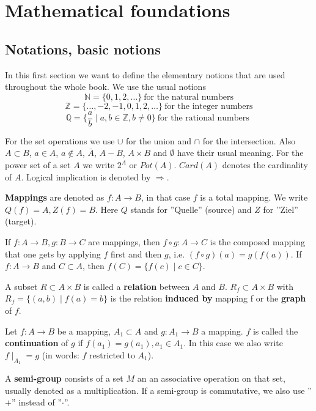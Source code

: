 \chapter{Mathematical foundations}

\section{Notations, basic notions}

In this first section we want to define the elementary notions that are used
throughout the whole book. We use the usual notions
\[ \mathbb{N} = \{ 0, 1, 2, \ldots \}\ \mbox{for the natural numbers} \]
\[ \mathbb{Z} = \{ \ldots, -2, -1, 0, 1, 2, \ldots \}\ \mbox{for the integer
numbers} \]
\[ \mathbb{Q} = \{ \frac{a}{b} \mid a,b \in \mathbb{Z}, b \neq 0 \}\ \mbox{for
the rational numbers } \]

For the set operations we use $\cup$ for the union and $\cap$ for the
intersection. Also $A \subset B$, $a \in A$, $a \not\in A$, $\bar{A}$, $A - B$,
$A \times B$ and $\emptyset$ have their usual meaning. For the power set of a
set $A$ we write $2^A$ or $Pot(A)$. $Card(A)$ denotes the cardinality of $A$.
Logical implication is denoted by $\Rightarrow$.

{\bf Mappings} are denoted as $f : A \rightarrow B$, in that case $f$ is a
total mapping. We write $Q(f) = A, Z(f) = B$. Here $Q$ stands for ''Quelle'' (source)
and $Z$ for ''Ziel'' (target).

If $f: A \rightarrow B, g : B \rightarrow C$ are mappings, then $f \circ g : A
\rightarrow C$ is the composed mapping that one gets by applying $f$ first and
then $g$, i.e. $(f \circ g)(a) = g(f(a))$. If $f:A \rightarrow B$ and $C
\subset A$, then $f(C) = \{ f(c) \mid c \in C \}$.

A subset $R \subset A \times B$ is called a {\bf relation} between $A$ and $B$.
$R_f \subset A \times B$ with $R_f = \{ (a,b) \mid f(a) = b \}$ is the relation
{\bf induced by} mapping f or the {\bf graph} of $f$.

Let $f : A \rightarrow B$ be a mapping, $A_1 \subset A$ and $g : A_1 \rightarrow
B$ a mapping. $f$ is called the {\bf continuation} of $g$ if $f(a_1) = g(a_1),
a_1 \in A_1$. In this case we also write $f \mid _{A_1} = g$ (in words: $f$
restricted to $A_1$).

A {\bf semi-group} consists of a set $M$ an an associative operation on that
set, usually denoted as a multiplication. If a semi-group is commutative, we
also use ''$+$'' instead of ''$\cdot$''.

